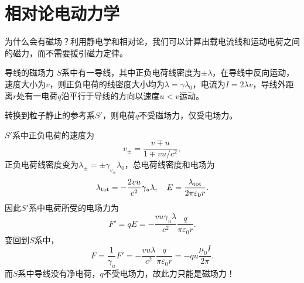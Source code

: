 \section{相对论电动力学}
为什么会有磁场？利用静电学和相对论，我们可以计算出载电流线和运动电荷之间的磁力，而不需要援引磁力定律。
\begin{example}{导线的磁场力}{}
    $S$系中有一导线，其中正负电荷线密度为$\pm\lambda$，在导线中反向运动，速度大小为$v$，则正负电荷的线密度大小均为$\lambda=\gamma\lambda_0$，电流为$I=2\lambda v$，导线外距离$r$处有一电荷$q$沿平行于导线的方向以速度$u<v$运动。

    \begin{center}
    \end{center}
    转换到粒子静止的参考系$S'$，则电荷$q$不受磁场力，仅受电场力。
    
    $S'$系中正负电荷的速度为
    \[
        v_\pm=\frac{v\mp u}{1\mp vu/c^2},
    \]
    正负电荷线密度变为$\lambda_\pm=\pm\gamma_{v_\pm}\lambda_0$，总电荷线密度和电场为
    \[
        \lambda_\mathrm{tot}=-\frac{2vu}{c^2}\gamma_u\lambda,\quad E=\frac{\lambda_\mathrm{tot}}{2\pi\varepsilon_0r}.
    \]
    因此$S'$系中电荷所受的电场力为
    \[
        F'=qE=-\frac{vu\gamma_u\lambda}{c^2}\frac q{\pi\varepsilon_0r}.
    \]
    变回到$S$系中，
    \[
        F=\frac1{\gamma_u}F'=-\frac{vu\lambda}{c^2}\frac q{\pi\varepsilon_0r}=-qu\frac{\mu_0I}{2\pi}.
    \]
    而$S$系中导线没有净电荷，$q$不受电场力，故此力只能是磁场力！
\end{example}

